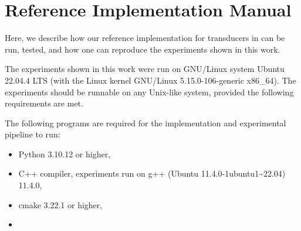 \chapter{Reference Implementation Manual}

Here, we describe how our reference implementation for transducers in \mata can be run, tested, and how one can reproduce the experiments shown in this work.



The experiments shown in this work were run on GNU/Linux system Ubuntu 22.04.4 LTS (with the Linux kernel GNU/Linux 5.15.0-106-generic x86\_64).
The experiments should be runnable on any Unix-like system, provided the following requirements are met.

The following programs are required for the implementation and experimental pipeline to run:
\begin{itemize}
    \item Python 3.10.12 or higher,
    \item C++ compiler, experiments run on g++ (Ubuntu 11.4.0-1ubuntu1\textasciitilde 22.04) 11.4.0,
    \item cmake 3.22.1 or higher,
    \item
\end{itemize}

